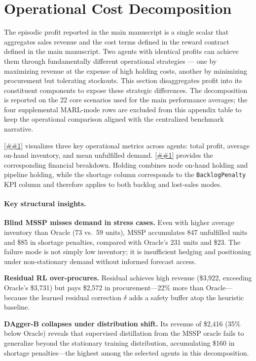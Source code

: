 \documentclass[10pt,a4paper]{article}
\providecommand{\Cref}[1]{\ref{##1}}
\let\origenumerate\enumerate
\let\endorigenumerate\endenumerate
\renewenvironment{enumerate}[1][]{\origenumerate}{\endorigenumerate}
\begin{document}
\section{Operational Cost Decomposition}\label{sec:appendix_decomposition}

The episodic profit reported in the main manuscript is a single scalar
that aggregates sales revenue and the cost terms defined in the reward
contract defined in the main manuscript. Two agents with identical profits
can achieve them through fundamentally different operational strategies
--- one by maximizing revenue at the expense of high holding costs,
another by minimizing procurement but tolerating stockouts.
This section disaggregates profit into its constituent components
to expose these strategic differences. The decomposition is reported
on the 22 core scenarios used for the main performance averages; the
four supplemental MARL-mode rows are excluded from this appendix table
to keep the operational comparison aligned with the centralized
benchmark narrative.

\Cref{fig:reward_decomp} visualizes three key operational metrics
across agents: total profit, average on-hand inventory, and mean
unfulfilled demand. \Cref{tab:cost_decomposition} provides the
corresponding financial breakdown. Holding combines node on-hand
holding and pipeline holding, while the shortage column corresponds to
the \texttt{BacklogPenalty} KPI column and therefore applies to both
backlog and lost-sales modes.

\paragraph{Key structural insights.}
\begin{enumerate}
  \item \textbf{Blind MSSP misses demand in stress cases.} Even with
    higher average inventory than Oracle (73 vs.\ 59 units), MSSP
    accumulates 847 unfulfilled units and \$85 in shortage penalties,
    compared with Oracle's 231 units and \$23. The failure mode is not
    simply low inventory; it is insufficient hedging and positioning
    under non-stationary demand without informed forecast access.
  \item \textbf{Residual RL over-procures.} Residual achieves high
    revenue (\$3{,}922, exceeding Oracle's \$3{,}731) but pays
    \$2{,}572 in procurement---22\% more than Oracle---because the
    learned residual correction $\delta$ adds a safety buffer atop
    the heuristic baseline.
  \item \textbf{DAgger-B collapses under distribution shift.}
    Its revenue of \$2{,}416 (35\% below Oracle) reveals that
    supervised distillation from the MSSP oracle fails to generalize
    beyond the stationary training distribution, accumulating
    \$160 in shortage penalties---the highest among the selected
    agents in this decomposition.
\end{enumerate}
\end{document}
